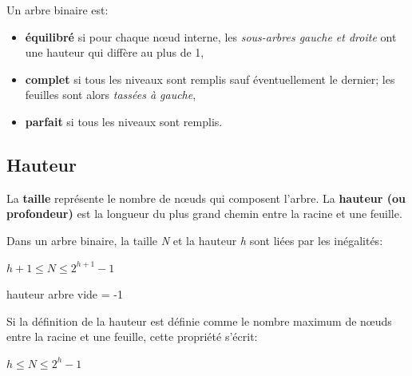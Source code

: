 \documentclass[a4paper,11pt]{article}
\begin{document}
\begin{Form}
\begin{center}
\label{noeud}
\end{center}
\begin{center}
\label{arbre}
\end{center}
Un arbre binaire est:
\begin{itemize}
\item \textbf{équilibré} si pour chaque nœud interne, les \emph{sous-arbres gauche et droite} ont une hauteur qui diffère au plus de 1,
\item \textbf{complet} si tous les niveaux sont remplis sauf éventuellement le dernier; les feuilles sont alors \emph{tassées à gauche},
\item \textbf{parfait} si tous les niveaux sont remplis.
\end{itemize}
\subsection{Hauteur}
La \textbf{taille} représente le nombre de nœuds qui composent l'arbre. La \textbf{hauteur (ou profondeur)} est la longueur du plus grand chemin entre la racine et une feuille.
\begin{aretenir}[]
Dans un arbre binaire, la taille \emph{N} et la hauteur \emph{h} sont liées par les inégalités:
\begin{center}
$h+1 \leqslant N \leqslant 2^{h+1}-1$
\end{center}
\end{aretenir}
\begin{commentprof}
hauteur arbre vide = -1
\end{commentprof}
\begin{aretenir}[Remarque]
Si la définition de la hauteur est définie comme le nombre maximum de nœuds entre la racine et une feuille, cette propriété s'écrit:
\begin{center}
$h \leqslant N \leqslant 2^{h}-1$
\end{center}
\end{aretenir}


\end{Form}
\end{document}

